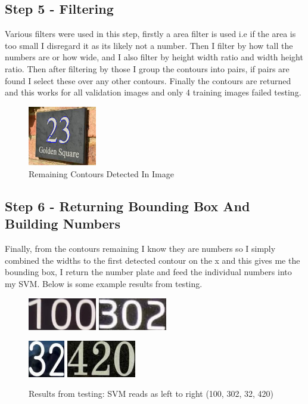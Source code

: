 \documentclass[conference]{IEEEtran}
\begin{document}
\subsection{Step 5 - Filtering}
Various filters were used in this step, firstly a area filter is used i.e if the area is too small I disregard it as its
likely not a number. Then I filter by how tall the numbers are or how wide, and I also filter by height width ratio and width
height ratio.
Then after filtering by those I group the contours into pairs, if pairs are found I select these over any other contours.
Finally the contours are returned and this works for all validation images and only 4 training images failed testing.
\begin{figure}[!htbp]
    \centerline{{\includegraphics[width=30mm, scale=0.5]{filtered.png}}}
    \caption{Remaining Contours Detected In Image}
    \label{fig}
\end{figure}
\subsection{Step 6 - Returning Bounding Box And Building Numbers}
Finally, from the contours remaining I know they are numbers so I simply combined the widths to the first detected contour
on the x and this gives me the bounding box, I return the number plate and feed the individual numbers into my SVM.
Below is some example results from testing.
\begin{figure}[!htbp]
    \centerline{{\includegraphics[width=30mm, scale=0.5]{DetectedArea08.jpg}}
    {\includegraphics[width=30mm, scale=0.5]{DetectedArea09.jpg}}}
    \centerline{{\includegraphics[width=16mm, scale=0.5]{DetectedArea10.jpg}}
    {\includegraphics[width=30mm, scale=0.5]{DetectedArea11.jpg}}}
    \caption{Results from testing: SVM reads as left to right (100, 302, 32, 420)}
    \label{fig}
\end{figure}
\end{document}
